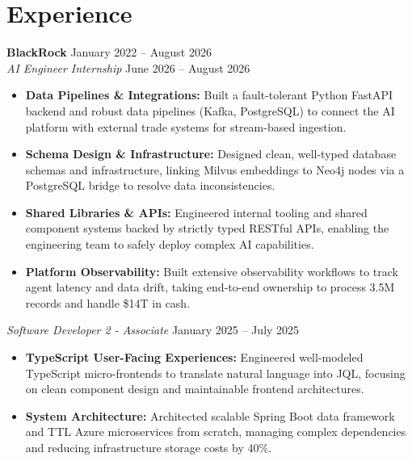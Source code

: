 \documentclass[11pt,a4paper]{article}
\begin{document}
\section{Experience}
\noindent
\textbf{BlackRock} \hfill January 2022 -- August 2026 \\
\textit{AI Engineer Internship} \hfill June 2026 -- August 2026
\begin{itemize}[leftmargin=*,noitemsep,topsep=0pt]
    \item \textbf{Data Pipelines \& Integrations:} Built a fault-tolerant Python FastAPI backend and robust data pipelines (Kafka, PostgreSQL) to connect the AI platform with external trade systems for stream-based ingestion.
    \item \textbf{Schema Design \& Infrastructure:} Designed clean, well-typed database schemas and infrastructure, linking Milvus embeddings to Neo4j nodes via a PostgreSQL bridge to resolve data inconsistencies.
    \item \textbf{Shared Libraries \& APIs:} Engineered internal tooling and shared component systems backed by strictly typed RESTful APIs, enabling the engineering team to safely deploy complex AI capabilities.
    \item \textbf{Platform Observability:} Built extensive observability workflows to track agent latency and data drift, taking end-to-end ownership to process 3.5M records and handle \$14T in cash.
\end{itemize}

\vspace{3pt}
\noindent
\textit{Software Developer 2 - Associate} \hfill January 2025 -- July 2025
\begin{itemize}[leftmargin=*,noitemsep,topsep=0pt]
    \item \textbf{TypeScript User-Facing Experiences:} Engineered well-modeled TypeScript micro-frontends to translate natural language into JQL, focusing on clean component design and maintainable frontend architectures.
    \item \textbf{System Architecture:} Architected scalable Spring Boot data framework and TTL Azure microservices from scratch, managing complex dependencies and reducing infrastructure storage costs by 40\%.
\end{itemize}
\end{document}
